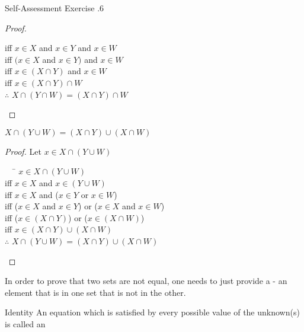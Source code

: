 \documentclass[\main/notes.tex]{subfiles}
\begin{document}
\begin{exercise}{Self-Assessment Exercise \thechapter.6}
\begin{multicols}{2}
\begin{questions}[label=(\alph*), itemsep=0.5em]
\begin{answer}
\begin{proof}
\begin{tabbing}
										iff \> $x \in X$ and $x \in Y$ and $x \in W$\\
										iff \> $(x \in X$ and $x \in Y)$ and $x \in W$\\
										iff \> $x \in (X \cap Y)$ and $x \in W$\\
										iff \> $x \in (X \cap Y) \cap W$\\
										$\therefore$ \> $X \cap (Y \cap W) = (X \cap Y) \cap W$
									\end{tabbing}
								\end{proof}
							\end{answer}
						\item $X \cap (Y \cup W) = (X \cap Y) \cup (X \cap W)$
							\begin{answer}
								\begin{proof}
									Let $x \in X \cap (Y \cup W)$
									\begin{tabbing}
										$\quad$ \= $x \in X \cap (Y \cup W)$\\
										iff \> $x \in X$ and $x \in (Y \cup W)$\\
										iff \> $x \in X$ and ($x \in Y$ or $x \in W$)\\
										iff \> ($x \in X$ and $x \in Y$) or ($x \in X$ and $x \in W$)\\
										iff \> ($x \in (X \cap Y)$) or ($x \in (X \cap W)$)\\
										iff \> $x \in (X \cap Y) \cup (X \cap W)$\\
										$\therefore$ \> $X \cap (Y \cup W) = (X \cap Y) \cup (X \cap W)$
									\end{tabbing}
								\end{proof}
							\end{answer}
					\end{questions}
				\end{multicols}
			\end{exercise}
			In order to prove that two sets are not equal, one needs to just provide a  - an element that is in one set that is not in the other.
			\begin{definition}{Identity}
				An equation which is satisfied by every possible value of the unknown(s) is called an 
			\end{definition}
		\pagebreak
\end{document}
